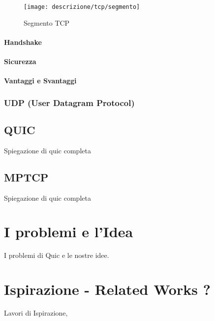\begin{figure}[!h]
\centering
\texttt{[image: descrizione/tcp/segmento]}
\caption{Segmento TCP}
\label{fig}
\end{figure}


\paragraph{ Handshake }
\paragraph{ Sicurezza }
\paragraph{ Vantaggi e Svantaggi }
\subsubsection{UDP (User Datagram Protocol)}

\subsection{QUIC}

Spiegazione di quic completa

\subsection{MPTCP}

Spiegazione di quic completa

\section{I problemi e l'Idea}

I problemi di Quic e le nostre idee.

\section{Ispirazione - Related Works ?}

Lavori di Ispirazione, 
